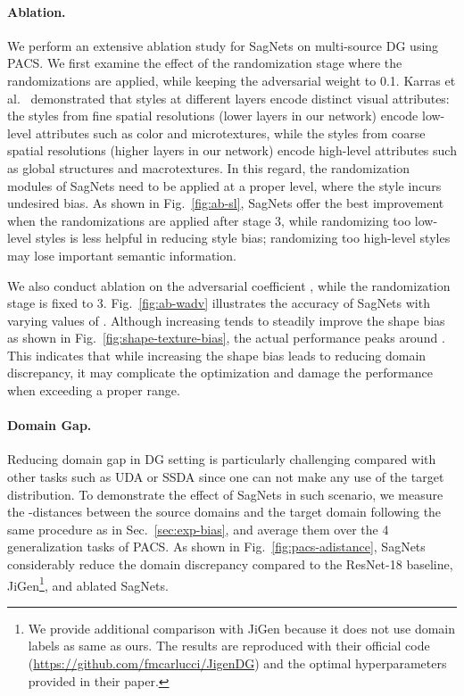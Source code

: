 \paragraph{\textnormal{\textbf{Ablation.}}}
We perform an extensive ablation study for SagNets on multi-source DG using PACS.
We first examine the effect of the randomization stage where the randomizations are applied, while keeping the adversarial weight to 0.1.
Karras et al.~\cite{karras2019style} demonstrated that styles at different layers encode distinct visual attributes: the styles from fine spatial resolutions (lower layers in our network) encode low-level attributes such as color and microtextures, while the styles from coarse spatial resolutions (higher layers in our network) encode high-level attributes such as global structures and macrotextures.
In this regard, the randomization modules of SagNets need to be applied at a proper level, where the style incurs undesired bias.
As shown in Fig.~\ref{fig:ab-sl}, SagNets offer the best improvement when the randomizations are applied after stage 3, 
while randomizing too low-level styles is less helpful in reducing style bias; randomizing too high-level styles may lose important semantic information.


We also conduct ablation on the adversarial coefficient , while the randomization stage is fixed to 3.
Fig.~\ref{fig:ab-wadv} illustrates the accuracy of SagNets with varying values of . 
Although increasing  tends to steadily improve the shape bias as shown in Fig.~\ref{fig:shape-texture-bias}, the actual performance peaks around .
This indicates that while increasing the shape bias leads to reducing domain discrepancy, it may complicate the optimization and damage the performance when exceeding a proper range.



\paragraph{\textnormal{\textbf{Domain Gap.}}}
Reducing domain gap in DG setting is particularly challenging compared with other tasks such as UDA or SSDA since one can not make any use of the target distribution.
To demonstrate the effect of SagNets in such scenario, we measure the -distances between the source domains and the target domain following the same procedure as in Sec.~\ref{sec:exp-bias}, and average them over the 4 generalization tasks of PACS.
As shown in Fig.~\ref{fig:pacs-adistance}, SagNets considerably reduce the domain discrepancy compared to the ResNet-18 baseline, JiGen\footnote{\label{fn:jigen}We provide additional comparison with JiGen because it does not use domain labels as same as ours.
The results are reproduced with their official code (\url{https://github.com/fmcarlucci/JigenDG}) and the optimal hyperparameters provided in their paper.
}, and ablated SagNets.


